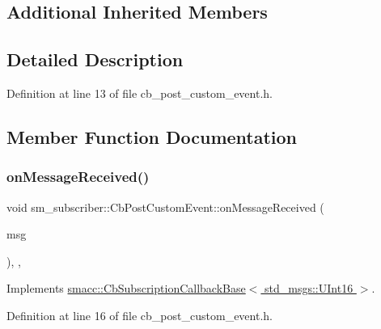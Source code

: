 \subsection*{Additional Inherited Members}


\subsection{Detailed Description}


Definition at line 13 of file cb\+\_\+post\+\_\+custom\+\_\+event.\+h.



\subsection{Member Function Documentation}
\mbox{\label{classsm__subscriber_1_1CbPostCustomEvent_a662b32b373fe517ec7d773b68517c532}} 
\subsubsection{\texorpdfstring{on\+Message\+Received()}{onMessageReceived()}}
{\footnotesize\ttfamily void sm\+\_\+subscriber\+::\+Cb\+Post\+Custom\+Event\+::on\+Message\+Received (\begin{DoxyParamCaption}\item[{const std\+\_\+msgs\+::\+U\+Int16 \&}]{msg }\end{DoxyParamCaption})\hspace{0.3cm}{\ttfamily [inline]}, {\ttfamily [override]}, {\ttfamily [virtual]}}



Implements \hyperlink{classsmacc_1_1CbSubscriptionCallbackBase_a77d8d3eee701b990277e69804eac0049}{smacc\+::\+Cb\+Subscription\+Callback\+Base$<$ std\+\_\+msgs\+::\+U\+Int16 $>$}.



Definition at line 16 of file cb\+\_\+post\+\_\+custom\+\_\+event.\+h.


